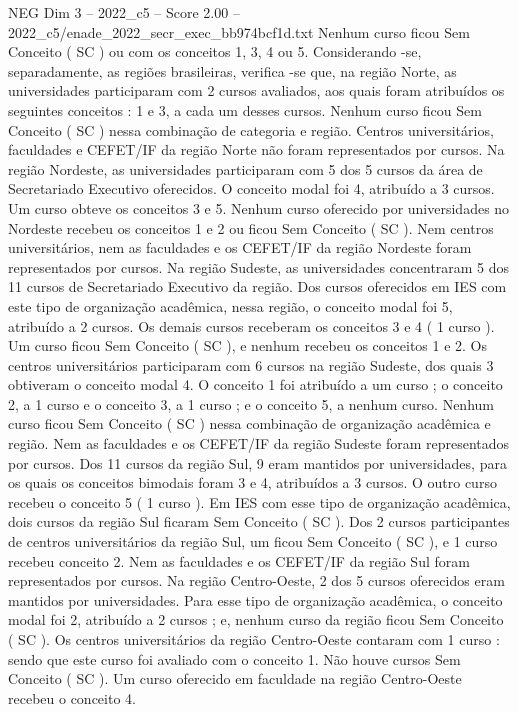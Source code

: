 \begin{textsample}{NEG Dim 3 – 2022\_c5 – Score 2.00 – 2022\_c5/enade\_2022\_secr\_exec\_bb974bcf1d.txt}
Nenhum curso ficou Sem Conceito ( SC ) ou com os conceitos 1, 3, 4 ou 5.
Considerando -se, separadamente, as regiões brasileiras, verifica -se que, na região Norte, as universidades participaram com 2 cursos avaliados, aos quais foram atribuídos os seguintes conceitos : 1 e 3, a cada um desses cursos.
Nenhum curso ficou Sem Conceito ( SC ) nessa combinação de categoria e região.
Centros universitários, faculdades e CEFET/IF da região Norte não foram representados por cursos.
Na região Nordeste, as universidades participaram com 5 dos 5 cursos da área de Secretariado Executivo oferecidos.
O conceito modal foi 4, atribuído a 3 cursos.
Um curso obteve os conceitos 3 e 5.
Nenhum curso oferecido por universidades no Nordeste recebeu os conceitos 1 e 2 ou ficou Sem Conceito ( SC ).
Nem centros universitários, nem as faculdades e os CEFET/IF da região Nordeste foram representados por cursos.
Na região Sudeste, as universidades concentraram 5 dos 11 cursos de Secretariado Executivo da região.
Dos cursos oferecidos em IES com este tipo de organização acadêmica, nessa região, o conceito modal foi 5, atribuído a 2 cursos.
Os demais cursos receberam os conceitos 3 e 4 ( 1 curso ).
Um curso ficou Sem Conceito ( SC ), e nenhum recebeu os conceitos 1 e 2.
Os centros universitários participaram com 6 cursos na região Sudeste, dos quais 3 obtiveram o conceito modal 4.
O conceito 1 foi atribuído a um curso ; o conceito 2, a 1 curso e o conceito 3, a 1 curso ; e o conceito 5, a nenhum curso.
Nenhum curso ficou Sem Conceito ( SC ) nessa combinação de organização acadêmica e região.
Nem as faculdades e os CEFET/IF da região Sudeste foram representados por cursos.
Dos 11 cursos da região Sul, 9 eram mantidos por universidades, para os quais os conceitos bimodais foram 3 e 4, atribuídos a 3 cursos.
O outro curso recebeu o conceito 5 ( 1 curso ).
Em IES com esse tipo de organização acadêmica, dois cursos da região Sul ficaram Sem Conceito ( SC ).
Dos 2 cursos participantes de centros universitários da região Sul, um ficou Sem Conceito ( SC ), e 1 curso recebeu conceito 2.
Nem as faculdades e os CEFET/IF da região Sul foram representados por cursos.
Na região Centro-Oeste, 2 dos 5 cursos oferecidos eram mantidos por universidades.
Para esse tipo de organização acadêmica, o conceito modal foi 2, atribuído a 2 cursos ; e, nenhum curso da região ficou Sem Conceito ( SC ).
Os centros universitários da região Centro-Oeste contaram com 1 curso : sendo que este curso foi avaliado com o conceito 1.
Não houve cursos Sem Conceito ( SC ).
Um curso oferecido em faculdade na região Centro-Oeste recebeu o conceito 4.

\end{textsample}
